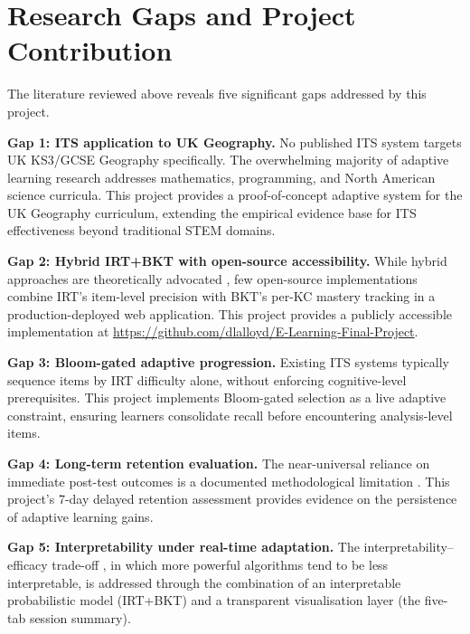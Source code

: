 \section{Research Gaps and Project Contribution}
\label{sec:lr_gaps}

The literature reviewed above reveals five significant gaps addressed by this
project.

\textbf{Gap 1: ITS application to UK Geography.}
No published ITS system targets UK KS3/GCSE Geography specifically. The
overwhelming majority of adaptive learning research addresses mathematics,
programming, and North American science curricula. This project provides
a proof-of-concept adaptive system for the UK Geography curriculum, extending
the empirical evidence base for ITS effectiveness beyond traditional STEM
domains.

\textbf{Gap 2: Hybrid IRT+BKT with open-source accessibility.}
While hybrid approaches are theoretically advocated \parencite{desmarais2012,
matos2025}, few open-source implementations combine IRT's item-level precision
with BKT's per-KC mastery tracking in a production-deployed web application.
This project provides a publicly accessible implementation at
\url{https://github.com/dlalloyd/E-Learning-Final-Project}.

\textbf{Gap 3: Bloom-gated adaptive progression.}
Existing ITS systems typically sequence items by IRT difficulty alone, without
enforcing cognitive-level prerequisites. This project implements Bloom-gated
selection as a live adaptive constraint, ensuring learners consolidate recall
before encountering analysis-level items.

\textbf{Gap 4: Long-term retention evaluation.}
The near-universal reliance on immediate post-test outcomes is a documented
methodological limitation \parencite{cepeda2006, vanlehn2011}. This project's
7-day delayed retention assessment provides evidence on the persistence of
adaptive learning gains.

\textbf{Gap 5: Interpretability under real-time adaptation.}
The interpretability--efficacy trade-off \parencite{matos2025}, in which more
powerful algorithms tend to be less interpretable, is addressed through the
combination of an interpretable probabilistic model (IRT+BKT) and a transparent
visualisation layer (the five-tab session summary).

